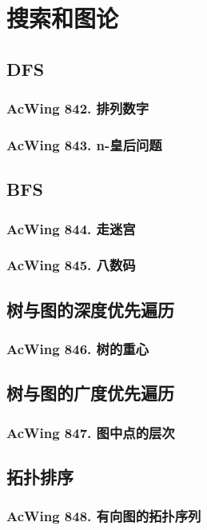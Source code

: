 \chapter{搜索和图论}

\section{DFS}
\subsection{AcWing 842. 排列数字}
\subsection{AcWing 843. n-皇后问题}

\section{BFS}
\subsection{AcWing 844. 走迷宫}
\subsection{AcWing 845. 八数码}

\section{树与图的深度优先遍历}
\subsection{AcWing 846. 树的重心}

\section{树与图的广度优先遍历}
\subsection{AcWing 847. 图中点的层次}

\section{拓扑排序}
\subsection{AcWing 848. 有向图的拓扑序列}

